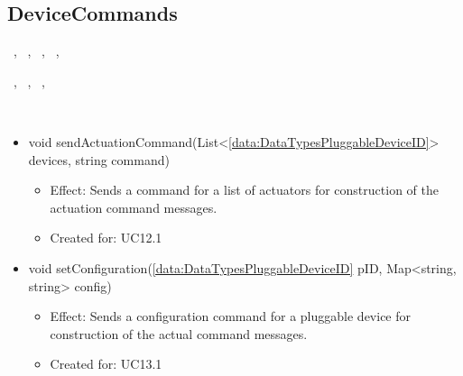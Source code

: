   \subsection{DeviceCommands}\label{int:OnlineServiceOnlineServiceApplicationManagerApplicationManagementLogicDeviceCommands}
    \begin{description}
      \item[Provided by:] \iconcomponent{}~, \iconcomponent{}~, \iconcomponent{}~, \iconcomponent{}~, \iconcomponent{}~
      \item[Required by:] \iconcomponent{}~, \iconcomponent{}~, \iconcomponent{}~, \iconcomponent{}~
      \item[Operations:] ~
    \begin{itemize}[noitemsep,nolistsep,leftmargin=-.25cm]
      \item \textsf{void sendActuationCommand(List\textless{}\ref{data:DataTypesPluggableDeviceID}\textgreater{} devices, string command)}
        \begin{itemize}[noitemsep,nolistsep]
           \item Effect: Sends a command for a list of actuators for construction of the actuation command messages.
\item Created for: UC12.1
        \end{itemize}
      \item \textsf{void setConfiguration(\ref{data:DataTypesPluggableDeviceID} pID, Map\textless{}string, string\textgreater{} config)}
        \begin{itemize}[noitemsep,nolistsep]
           \item Effect: Sends a configuration command for a pluggable device for construction of the actual command messages.
\item Created for: UC13.1
        \end{itemize}
    \end{itemize}
    \end{description}


